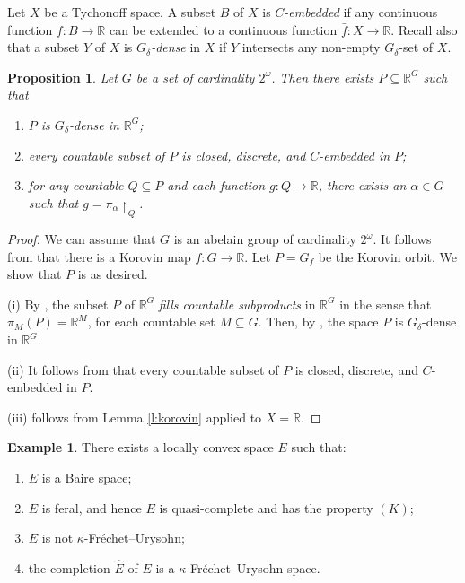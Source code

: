 \documentclass[preprint,11pt]{elsarticle}
\newtheorem{proposition}[theorem]{Proposition}
\theoremstyle{definition}
\newtheorem{example}[theorem]{Example}
\theoremstyle{remark}
\numberwithin{equation}{section}
\numberwithin{theorem}{section}
\newcommand{\w}{\omega}
\newcommand{\IR}{\mathbb{R}}
\begin{document}
Let $X$ be a Tychonoff space. A subset $B$ of $X$ is {\em $C$-embedded} if any continuous function $f:B\to\IR$ can be extended to a continuous function $\bar f:X\to\IR$. Recall also that a subset $Y$ of $X$ is {\em $G_\delta$-dense} in $X$ if $Y$ intersects any non-empty $G_\delta$-set of $X$.

\begin{proposition}\label{p:P-G_delta-dense}
Let $G$ be a set of cardinality $2^\omega$. Then there exists $P\subseteq \IR^G$ such that
\begin{enumerate}
\item[{\rm(i)}] $P$ is $G_\delta$-dense in $\IR^G$;
\item[{\rm(ii)}] every countable subset of $P$ is closed, discrete, and $C$-embedded in $P$;
\item[{\rm(iii)}]  for any countable $Q\subseteq P$ and each function $g: Q\to \IR$, there exists an $\alpha\in G$ such that $g=\pi_\alpha{\restriction}_Q$.
\end{enumerate}
\end{proposition}
\begin{proof}
We can assume that $G$ is an abelain group of cardinality $2^\w$. It follows from \cite[Theorem 1]{ReznichenkoTkachenko2024} that there is a Korovin map $f:G\to \IR$. Let $P=G_f$ be the Korovin orbit.
We show that $P$ is as desired.

(i) By \cite[Proposition 1]{ReznichenkoTkachenko2024}, the subset $P$ of $\IR^G$ {\em fills countable subproducts} in $\IR^G$ in the sense that  $\pi_M(P)=\IR^M$, for each countable set $M \subseteq G$. Then, by \cite[Proposition~2.16]{BG-Baire}, the space $P$ is $G_\delta$-dense in $\IR^G$.

(ii) It follows from \cite[Theorem 2]{ReznichenkoTkachenko2024} that every countable subset of $P$ is closed, discrete, and $C$-embedded in $P$.

(iii) follows from Lemma \ref{l:korovin} applied to $X=\IR$.
\end{proof}





\begin{example}\label{lcb-not_kFU}
There exists a locally convex space $E$ such that:
\begin{enumerate}
\item[{\rm(i)}] $E$ is a Baire space;
\item[{\rm(ii)}]  $E$ is feral, and hence $E$ is quasi-complete and has the property $(K)$;
\item[{\rm(iii)}]  $E$ is not $\kappa$-Fr\'{e}chet--Urysohn;
\item[{\rm(iv)}] the completion $\widehat E$ of $E$ is a $\kappa$-Fr\'{e}chet--Urysohn space.
\end{enumerate}
\end{example}
\end{document}
